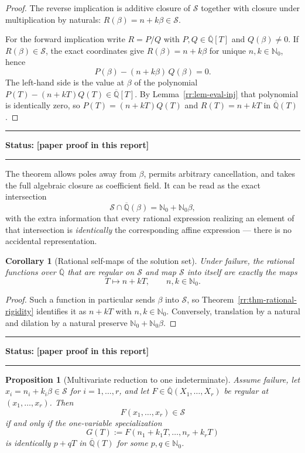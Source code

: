 \documentclass[11pt,oneside]{article}
\newtheorem{proposition}[theorem]{Proposition}
\newtheorem{corollary}[theorem]{Corollary}
\theoremstyle{definition}
\theoremstyle{remark}
\newcommand{\Nzero}{\mathbb N_0}
\newcommand{\Abar}{\overline{\mathbb Q}}
\newcommand{\Sol}{\mathcal S}
\newcommand{\statusnew}{\textcolor{newgreen}{\textbf{[paper proof in this report]}}}
\newenvironment{statusbox}[1]
{\begin{center}\begin{minipage}{0.94\textwidth}\raggedright\hbadness=10000\hrule
\vspace{0.45em}\textbf{Status:} #1\par\vspace{0.35em}}
{\vspace{0.35em}\hrule\end{minipage}\end{center}}
\begin{document}
\begin{proof}
The reverse implication is additive closure of $\Sol$ together with closure under
multiplication by naturals: $R(\beta)=n+k\beta\in\Sol$.

For the forward implication write $R=P/Q$ with $P,Q\in\Abar[T]$ and $Q(\beta)\ne0$.  If
$R(\beta)\in\Sol$, the exact coordinates give $R(\beta)=n+k\beta$ for unique
$n,k\in\Nzero$, hence
\[
 P(\beta)-(n+k\beta)\,Q(\beta)=0 .
\]
The left-hand side is the value at $\beta$ of the polynomial
$P(T)-(n+kT)Q(T)\in\Abar[T]$.  By Lemma~\ref{rr:lem-eval-inj} that polynomial is identically
zero, so $P(T)=(n+kT)Q(T)$ and $R(T)=n+kT$ in $\Abar(T)$.
\end{proof}

\begin{statusbox}{\statusnew}
\end{statusbox}

The theorem allows poles away from $\beta$, permits arbitrary cancellation, and takes the full
algebraic closure as coefficient field.  It can be read as the exact intersection
\begin{equation}
 \Sol\cap\Abar(\beta)=\Nzero+\Nzero\beta ,
 \label{rr:eq-intersection}
\end{equation}
with the extra information that every rational expression realizing an element of that
intersection is \emph{identically} the corresponding affine expression --- there is no
accidental representation.

\begin{corollary}[Rational self-maps of the solution set]
\label{rr:cor-selfmaps}
Under failure, the rational functions over $\Abar$ that are regular on $\Sol$ and map $\Sol$
into itself are exactly the maps
\[
 T\longmapsto n+kT,
 \qquad n,k\in\Nzero .
\]
\end{corollary}

\begin{proof}
Such a function in particular sends $\beta$ into $\Sol$, so
Theorem~\ref{rr:thm-rational-rigidity} identifies it as $n+kT$ with $n,k\in\Nzero$.
Conversely, translation by a natural and dilation by a natural preserve
$\Nzero+\Nzero\beta$.
\end{proof}

\begin{statusbox}{\statusnew}
\end{statusbox}

\begin{proposition}[Multivariate reduction to one indeterminate]
\label{rr:prop-multivariate}
Assume failure, let $x_i=n_i+k_i\beta\in\Sol$ for $i=1,\ldots,r$, and let
$F\in\Abar(X_1,\ldots,X_r)$ be regular at $(x_1,\ldots,x_r)$.  Then
\[
 F(x_1,\ldots,x_r)\in\Sol
\]
if and only if the one-variable specialization
\[
 G(T):=F(n_1+k_1T,\ldots,n_r+k_rT)
\]
is identically $p+qT$ in $\Abar(T)$ for some $p,q\in\Nzero$.
\end{proposition}
\end{document}
